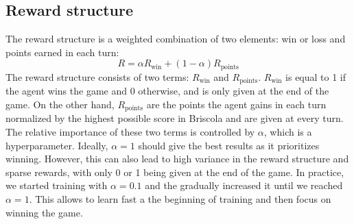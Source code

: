 \subsection{Reward structure}
The reward structure is a weighted combination of two elements: win or loss and points earned in each turn:
\begin{equation}
    R = \alpha R_\textrm{win} + (1 - \alpha) R_\textrm{points}
    \label{eq:reward-structure}
\end{equation}
The reward structure consists of two terms: $R_\textrm{win}$ and $R_\textrm{points}$. $R_\textrm{win}$ is equal to 1 if the agent wins the game and 0 otherwise, and is only given at the end of the game. On the other hand, $R_\textrm{points}$ are the points the agent gains in each turn normalized by the highest possible score in Briscola and are given at every turn. The relative importance of these two terms is controlled by $\alpha$, which is a hyperparameter. Ideally, $\alpha=1$ should give the best results as it prioritizes winning. However, this can also lead to high variance in the reward structure and sparse rewards, with only 0 or 1 being given at the end of the game. In practice, we started training with $\alpha=0.1$ and the gradually increased it until we reached $\alpha=1$. This allows to learn fast a the beginning of training and then focus on winning the game.

